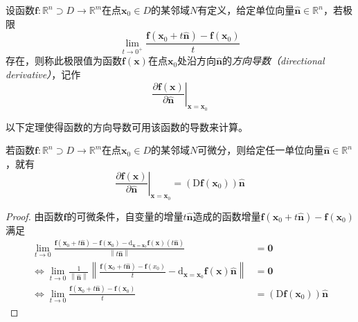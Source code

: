 \documentclass[../main.tex]{subfiles}
\begin{document}
\begin{definition}[方向导数]\label{def:II.4.18}
    设函数$\mathbf{f}:\mathbb{R}^n\supset D\rightarrow\mathbb{R}^m$在点$\mathbf{x}_0\in D$的某邻域$N$有定义，给定单位向量$\mathbf{\hat{n}}\in\mathbb{R}^n$，若极限
    \[\lim_{t\to 0^+}\frac{\mathbf{f}\left(\mathbf{x}_0+t\mathbf{\hat{n}}\right)-\mathbf{f}\left(\mathbf{x}_0\right)}{t}\]
    存在，则称此极限值为函数$\mathbf{f}\left(\mathbf{x}\right)$在点$\mathbf{x}_0$处沿方向$\mathbf{\hat{n}}$的\emph{方向导数（directional derivative）}，记作
    \[\left.\frac{\partial\mathbf{f}\left(\mathbf{x}\right)}{\partial\mathbf{\hat{n}}}\right|_{\mathbf{x}=\mathbf{x}_0}\]
\end{definition}

以下定理使得函数的方向导数可用该函数的导数来计算。

\begin{theorem}\label{thm:II.4.10}
    若函数$\mathbf{f}:\mathbb{R}^n\supset D\rightarrow\mathbb{R}^m$在点$\mathbf{x}_0\in D$的某邻域$N$可微分，则给定任一单位向量$\mathbf{\hat{n}}\in\mathbb{R}^n$，就有
    \[\left.\frac{\partial\mathbf{f}\left(\mathbf{x}\right)}{\partial\mathbf{\hat{n}}}\right|_{\mathbf{x}=\mathbf{x}_0}=\left(\mathrm{D}\mathbf{f}\left(\mathbf{x}_0\right)\right)\mathbf{\hat{n}}\]
\end{theorem}
\begin{proof}
    由函数$\mathbf{f}$的可微条件，自变量的增量$t\mathbf{\hat{n}}$造成的函数增量$\mathbf{f}\left(\mathbf{x}_0+t\mathbf{\hat{n}}\right)-\mathbf{f}\left(\mathbf{x}_0\right)$满足
    \begin{align*}
        \lim_{t\to 0}\frac{\mathbf{f}\left(\mathbf{x}_0+t\mathbf{\hat{n}}\right)-\mathbf{f}\left(\mathbf{x}_0\right)-\mathrm{d}_{\mathbf{x}=\mathbf{x}_0}\mathbf{f}\left(\mathbf{x}\right)\left(t\mathbf{\hat{n}}\right)}{\left\|t\mathbf{\hat{n}}\right\|}                  & =\mathbf{0}                                                                 \\
        \Leftrightarrow\lim_{t\to 0}\frac{1}{\left\|\mathbf{\hat{n}}\right\|}\left\|\frac{\mathbf{f}\left(\mathbf{x}_0+t\mathbf{\hat{n}}\right)-\mathbf{f}\left(x_0\right)}{t}-\mathrm{d}_{\mathbf{x}=\mathbf{x}_0}\mathbf{f}\left(\mathbf{x}\right)\mathbf{\hat{n}}\right\| & =\mathbf{0}                                                                 \\
        \Leftrightarrow\lim_{t\to 0}\frac{\mathbf{f}\left(\mathbf{x}_0+t\mathbf{\hat{n}}\right)-\mathbf{f}\left(\mathbf{x}_0\right)}{t}                                                                                                                                      & =\left(\mathrm{D}\mathbf{f}\left(\mathbf{x}_0\right)\right)\mathbf{\hat{n}}
    \end{align*}
\end{proof}
\end{document}
